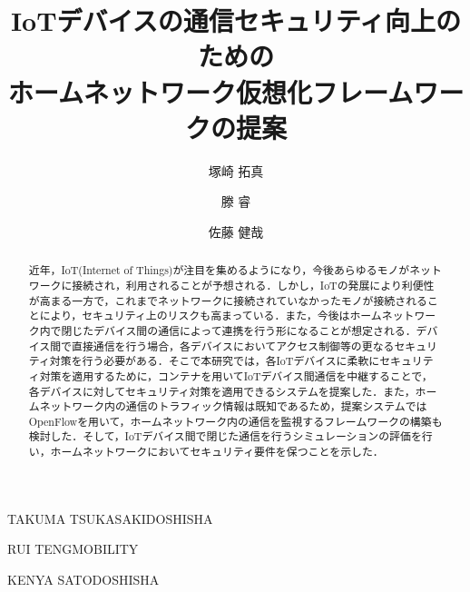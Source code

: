 \documentclass[Japanese]{dicomopapers}
\begin{document}
\title{IoTデバイスの通信セキュリティ向上のための\\ホームネットワーク仮想化フレームワークの提案}


\author{塚崎 拓真}{TAKUMA TSUKASAKI}{DOSHISHA}
\author{滕 睿}{RUI TENG}{MOBILITY}
\author{佐藤 健哉}{KENYA SATO}{DOSHISHA}

\begin{abstract}
	近年，IoT(Internet of Things)が注目を集めるようになり，今後あらゆるモノがネットワークに接続され，利用されることが予想される．しかし，IoTの発展により利便性が高まる一方で，これまでネットワークに接続されていなかったモノが接続されることにより，セキュリティ上のリスクも高まっている．また，今後はホームネットワーク内で閉じたデバイス間の通信によって連携を行う形になることが想定される．デバイス間で直接通信を行う場合，各デバイスにおいてアクセス制御等の更なるセキュリティ対策を行う必要がある．そこで本研究では，各IoTデバイスに柔軟にセキュリティ対策を適用するために，コンテナを用いてIoTデバイス間通信を中継することで，各デバイスに対してセキュリティ対策を適用できるシステムを提案した．また，ホームネットワーク内の通信のトラフィック情報は既知であるため，提案システムではOpenFlowを用いて，ホームネットワーク内の通信を監視するフレームワークの構築も検討した．そして，IoTデバイス間で閉じた通信を行うシミュレーションの評価を行い，ホームネットワークにおいてセキュリティ要件を保つことを示した．
\end{abstract}

\maketitle

\end{document}
